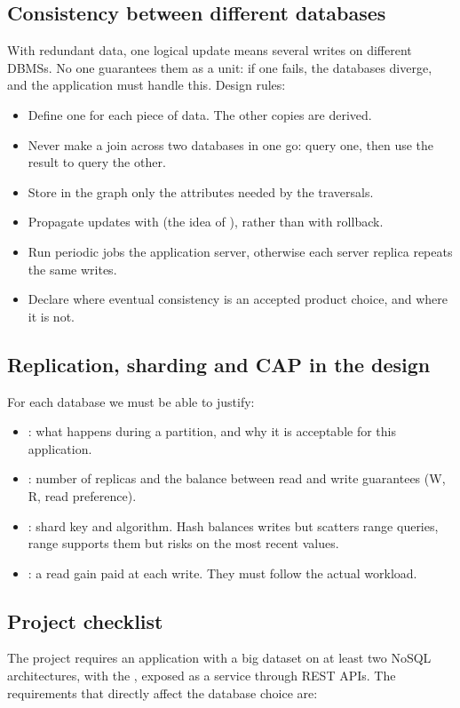 \subsection{Consistency between different databases}\label{sec:consistency-between-dbs}
With redundant data, one logical update means several writes on different DBMSs. No one guarantees them as a unit: if one fails, the databases diverge, and the application must handle this. Design rules:
\begin{itemize}
  \item Define one  for each piece of data. The other copies are derived.
  \item Never make a join across two databases in one go: query one, then use the result to query the other.
  \item Store in the graph only the attributes needed by the traversals.
  \item Propagate updates with  (the idea of ), rather than with rollback.
  \item Run periodic jobs  the application server, otherwise each server replica repeats the same writes.
  \item Declare where eventual consistency is an accepted product choice, and where it is not.
\end{itemize}

\subsection{Replication, sharding and CAP in the design}
For each database we must be able to justify:
\begin{itemize}
  \item {}: what happens during a partition, and why it is acceptable for this application.
  \item {}: number of replicas and the balance between read and write guarantees (W, R, read preference).
  \item {}: shard key and algorithm. Hash balances writes but scatters range queries, range supports them but risks  on the most recent values.
  \item {}: a read gain paid at each write. They must follow the actual workload.
\end{itemize}

\subsection{Project checklist}
The project requires an application with a big dataset on at least two NoSQL architectures, with the , exposed as a service through REST APIs. The requirements that directly affect the database choice are:


